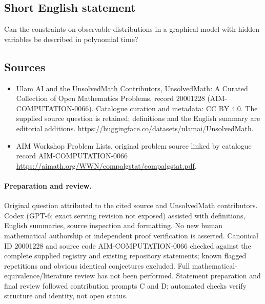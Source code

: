 \documentclass[11pt]{article}
\begin{document}
\subsection{Short English statement}
Can the constraints on observable distributions in a graphical model with hidden variables be described in polynomial time?
\subsection{Sources}
\begin{itemize}
\item[\hypertarget{source:20001228:1}{S1}] Ulam AI and the UnsolvedMath Contributors, UnsolvedMath: A Curated Collection of Open Mathematics Problems, record 20001228 (AIM-COMPUTATION-0066). Catalogue curation and metadata: CC BY 4.0. The supplied source question is retained; definitions and the English summary are editorial additions.
\url{https://huggingface.co/datasets/ulamai/UnsolvedMath}.
\item[\hypertarget{source:20001228:2}{S2}] AIM Workshop Problem Lists, original problem source linked by catalogue record AIM-COMPUTATION-0066
\url{https://aimath.org/WWN/compalgstat/compalgstat.pdf}.
\end{itemize}
\paragraph{Preparation and review.}
Original question attributed to the cited source and UnsolvedMath contributors. Codex (GPT-6; exact serving revision not exposed) assisted with definitions, English summaries, source inspection and formatting. No new human mathematical authorship or independent proof verification is asserted. Canonical ID 20001228 and source code AIM-COMPUTATION-0066 checked against the complete supplied registry and existing repository statements; known flagged repetitions and obvious identical conjectures excluded. Full mathematical-equivalence/literature review has not been performed. Statement preparation and final review followed contribution prompts C and D; automated checks verify structure and identity, not open status.
\label{end:20001228}
\end{document}
